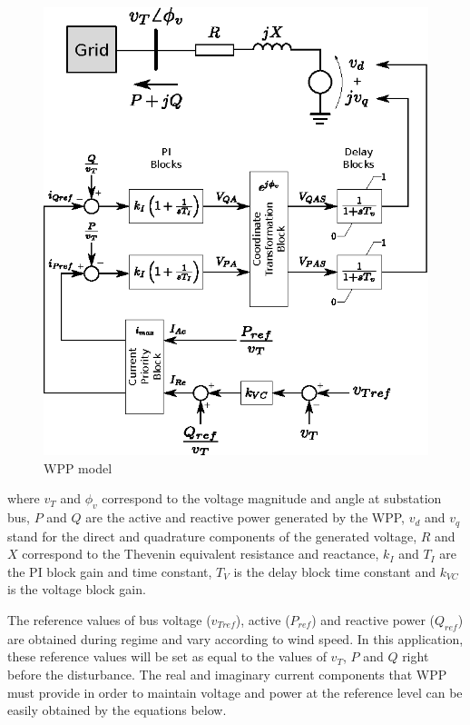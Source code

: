 \begin{figure}[h]
	\caption{WPP model}
	\begin{center}
		\includegraphics[scale=1]{Images/ErlichModel.eps}
	\end{center}
	\label{fig: ErlMod}
\end{figure}

\noindent where $v_{T}$ and $\phi_{v}$ correspond to the voltage magnitude and angle at substation bus, $P$ and $Q$ are the active and reactive power generated by the WPP, $v_{d}$ and $v_{q}$ stand for the direct and quadrature components of the generated voltage, $R$ and $X$ correspond to the Thevenin equivalent resistance and reactance, $k_{I}$ and $T_{I}$ are the PI block gain and time constant, $T_{V}$ is the delay block time constant and $k_{VC}$ is the voltage block gain.

The reference values of bus voltage ($v_{Tref}$), active ($P_{ref}$) and reactive power ($Q_{ref}$) are obtained during regime and vary according to wind speed. In this application, these reference values will be set as equal to the values of $v_{T}$, $P$ and $Q$ right before the disturbance. The real and imaginary current components that WPP must provide in order to maintain voltage and power at the reference level can be easily obtained by the equations below.

